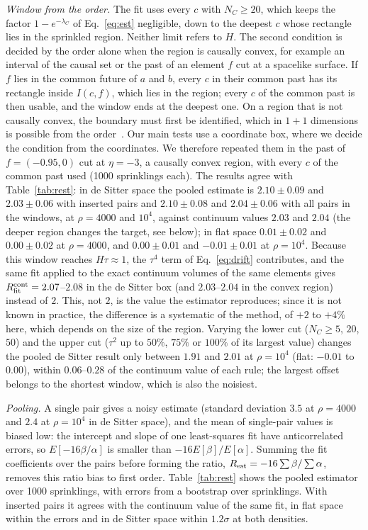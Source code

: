 \documentclass[prd,twocolumn,superscriptaddress,nofootinbib,amsmath,amssymb,floatfix]{revtex4-2}
\begin{document}
\emph{Window from the order.} The fit uses every $c$ with $N_C\geq20$, which keeps the factor $1-e^{-\lambda_C}$ of Eq.~\eqref{eq:est} negligible, down to the deepest $c$ whose rectangle lies in the sprinkled region. Neither limit refers to $H$. The second condition is decided by the order alone when the region is causally convex, for example an interval of the causal set or the past of an element $f$ cut at a spacelike surface. If $f$ lies in the common future of $a$ and $b$, every $c$ in their common past has its rectangle inside $I(c,f)$, which lies in the region; every $c$ of the common past is then usable, and the window ends at the deepest one. On a region that is not causally convex, the boundary must first be identified, which in $1+1$ dimensions is possible from the order~\cite{Cunningham18}. Our main tests use a coordinate box, where we decide the condition from the coordinates. We therefore repeated them in the past of $f=(-0.95,0)$ cut at $\eta=-3$, a causally convex region, with every $c$ of the common past used (1000 sprinklings each). The results agree with Table~\ref{tab:rest}: in de Sitter space the pooled estimate is $2.10\pm0.09$ and $2.03\pm0.06$ with inserted pairs and $2.10\pm0.08$ and $2.04\pm0.06$ with all pairs in the windows, at $\rho=4000$ and $10^4$, against continuum values $2.03$ and $2.04$ (the deeper region changes the target, see below); in flat space $0.01\pm0.02$ and $0.00\pm0.02$ at $\rho=4000$, and $0.00\pm0.01$ and $-0.01\pm0.01$ at $\rho=10^4$. Because this window reaches $H\tau\approx1$, the $\tau^4$ term of Eq.~\eqref{eq:drift} contributes, and the same fit applied to the exact continuum volumes of the same elements gives $R_{\rm fit}^{\rm cont}=2.07$--$2.08$ in the de Sitter box (and $2.03$--$2.04$ in the convex region) instead of $2$. This, not $2$, is the value the estimator reproduces; since it is not known in practice, the difference is a systematic of the method, of $+2$ to $+4\%$ here, which depends on the size of the region. Varying the lower cut ($N_C\geq5$, $20$, $50$) and the upper cut ($\tau^2$ up to $50\%$, $75\%$ or $100\%$ of its largest value) changes the pooled de Sitter result only between $1.91$ and $2.01$ at $\rho=10^4$ (flat: $-0.01$ to $0.00$), within $0.06$--$0.28$ of the continuum value of each rule; the largest offset belongs to the shortest window, which is also the noisiest.

\emph{Pooling.} A single pair gives a noisy estimate (standard deviation $3.5$ at $\rho=4000$ and $2.4$ at $\rho=10^4$ in de Sitter space), and the mean of single-pair values is biased low: the intercept and slope of one least-squares fit have anticorrelated errors, so $E[-16\beta/\alpha]$ is smaller than $-16E[\beta]/E[\alpha]$. Summing the fit coefficients over the pairs before forming the ratio, $R_{\rm est}=-16\sum\beta/\sum\alpha$, removes this ratio bias to first order. Table~\ref{tab:rest} shows the pooled estimator over 1000 sprinklings, with errors from a bootstrap over sprinklings. With inserted pairs it agrees with the continuum value of the same fit, in flat space within the errors and in de Sitter space within $1.2\sigma$ at both densities.
\end{document}
